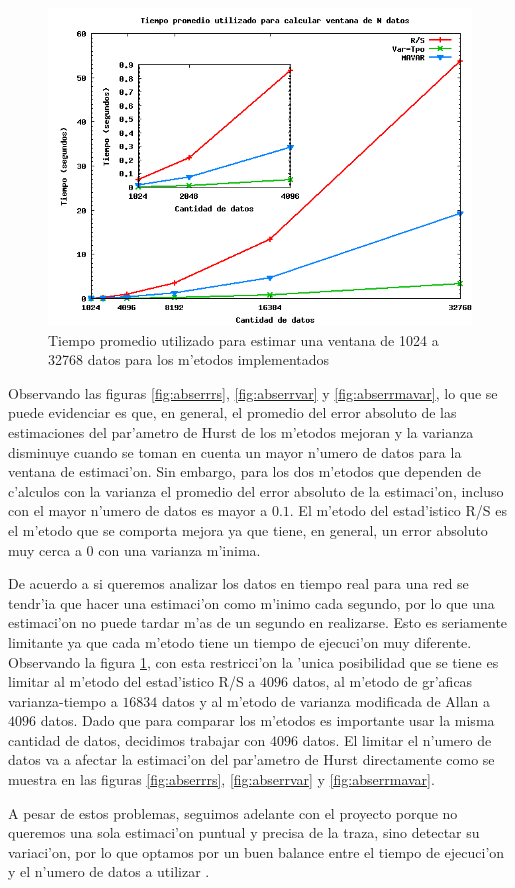 \clearpage

\begin{figure}[htb]
\centering
\includegraphics[scale=0.38,type=png,ext=.png,read=.png]{figures/time-n-plot}
\caption{Tiempo promedio utilizado para estimar una ventana de 1024 a 32768
datos para los m'etodos implementados}
\label{fig:tiempoventana}
\end{figure}

Observando las figuras \ref{fig:abserrrs}, \ref{fig:abserrvar} y
\ref{fig:abserrmavar}, lo que se puede evidenciar es que, en general, el
promedio del error absoluto de las estimaciones del par'ametro de Hurst de los
m'etodos mejoran y la varianza disminuye cuando se toman en cuenta un mayor
n'umero de datos para la ventana de estimaci'on. Sin embargo, para los
dos m'etodos que dependen de c'alculos con la varianza el promedio del error 
absoluto de la estimaci'on, incluso con el mayor n'umero de datos es mayor a
$0.1$. El m'etodo del estad'istico R/S es el m'etodo que se comporta mejora 
ya que tiene, en general, un error absoluto muy cerca a $0$ con una varianza
m'inima. 

De acuerdo a \cite{intelligentfuzzy} si queremos analizar los datos en tiempo
real para una red se tendr'ia que hacer una estimaci'on como m'inimo cada
segundo, por lo que una estimaci'on no puede tardar m'as de un segundo en
realizarse. Esto es seriamente limitante ya que cada m'etodo tiene un tiempo de
ejecuci'on muy diferente. Observando la figura \ref{fig:tiempoventana}, con
esta restricci'on la 'unica posibilidad que se tiene es limitar al m'etodo del
estad'istico R/S a $4096$ datos, al m'etodo de gr'aficas varianza-tiempo a
$16834$ datos y al m'etodo de varianza modificada de Allan a $4096$ datos. Dado
que para comparar los m'etodos es importante usar la misma cantidad de datos,
decidimos trabajar con $4096$ datos. El limitar el n'umero de datos va a
afectar la estimaci'on del par'ametro de Hurst directamente como se muestra en
las figuras \ref{fig:abserrrs}, \ref{fig:abserrvar} y \ref{fig:abserrmavar}. 

A pesar de estos problemas, seguimos adelante con el proyecto porque no
queremos una sola estimaci'on puntual y precisa de la traza, sino detectar su
variaci'on, por lo que optamos por un buen balance entre el tiempo de
ejecuci'on y el n'umero de datos a utilizar \cite{intelligentfuzzy}.


